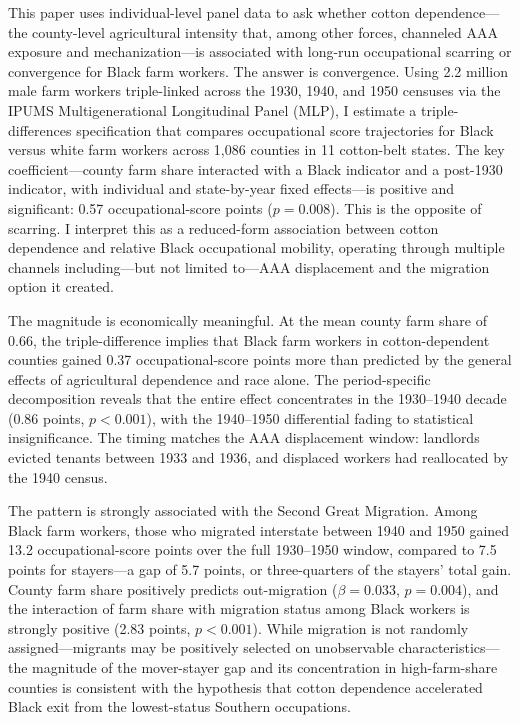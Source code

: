 \documentclass[12pt]{article}
\begin{document}
This paper uses individual-level panel data to ask whether cotton dependence---the county-level agricultural intensity that, among other forces, channeled AAA exposure and mechanization---is associated with long-run occupational scarring or convergence for Black farm workers. The answer is convergence. Using 2.2 million male farm workers triple-linked across the 1930, 1940, and 1950 censuses via the IPUMS Multigenerational Longitudinal Panel (MLP), I estimate a triple-differences specification that compares occupational score trajectories for Black versus white farm workers across 1,086 counties in 11 cotton-belt states. The key coefficient---county farm share interacted with a Black indicator and a post-1930 indicator, with individual and state-by-year fixed effects---is positive and significant: 0.57 occupational-score points ($p = 0.008$). This is the opposite of scarring. I interpret this as a reduced-form association between cotton dependence and relative Black occupational mobility, operating through multiple channels including---but not limited to---AAA displacement and the migration option it created.

The magnitude is economically meaningful. At the mean county farm share of 0.66, the triple-difference implies that Black farm workers in cotton-dependent counties gained 0.37 occupational-score points more than predicted by the general effects of agricultural dependence and race alone. The period-specific decomposition reveals that the entire effect concentrates in the 1930--1940 decade (0.86 points, $p < 0.001$), with the 1940--1950 differential fading to statistical insignificance. The timing matches the AAA displacement window: landlords evicted tenants between 1933 and 1936, and displaced workers had reallocated by the 1940 census.

The pattern is strongly associated with the Second Great Migration. Among Black farm workers, those who migrated interstate between 1940 and 1950 gained 13.2 occupational-score points over the full 1930--1950 window, compared to 7.5 points for stayers---a gap of 5.7 points, or three-quarters of the stayers' total gain. County farm share positively predicts out-migration ($\beta = 0.033$, $p = 0.004$), and the interaction of farm share with migration status among Black workers is strongly positive (2.83 points, $p < 0.001$). While migration is not randomly assigned---migrants may be positively selected on unobservable characteristics---the magnitude of the mover-stayer gap and its concentration in high-farm-share counties is consistent with the hypothesis that cotton dependence accelerated Black exit from the lowest-status Southern occupations.
\end{document}
